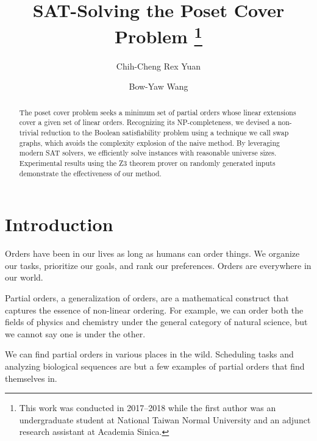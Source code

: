 \documentclass{llncs}
\begin{document}
\title{
    SAT-Solving the Poset Cover Problem
    \thanks{This work was conducted in 2017--2018 while the first author
    was an undergraduate student at National Taiwan Normal University
    and an adjunct research assistant at Academia Sinica.}
}

\author{Chih-Cheng Rex Yuan \and
        Bow-Yaw Wang}


\maketitle

\begin{abstract}
The poset cover problem seeks a minimum set of partial orders whose linear extensions cover a given set of linear orders. Recognizing its NP-completeness, we devised a non-trivial reduction to the Boolean satisfiability problem using a technique we call swap graphs, which avoids the complexity explosion of the naive method. By leveraging modern SAT solvers, we efficiently solve instances with reasonable universe sizes. Experimental results using the Z3 theorem prover on randomly generated inputs demonstrate the effectiveness of our method.

\end{abstract}

\section{Introduction}

Orders have been in our lives as long as humans can order things. We organize our tasks, prioritize our goals, and rank our preferences. Orders are everywhere in our world.

Partial orders, a generalization of orders, are a mathematical construct that captures the essence of non-linear ordering. For example, we can order both the fields of physics and chemistry under the general category of natural science, but we cannot say one is under the other.

We can find partial orders in various places in the wild. Scheduling tasks and analyzing biological sequences are but a few examples of partial orders that find themselves in\cite{heath2013poset,fernandez2013mining}.
\end{document}
